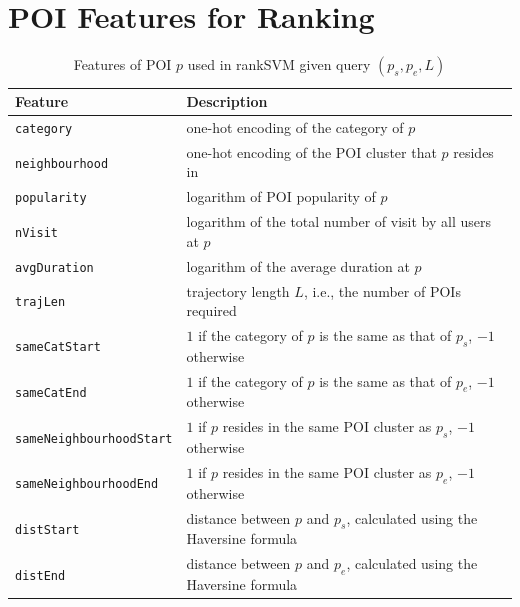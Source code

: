 

\onecolumn

\appendix



\section{POI Features for Ranking}

\begin{table}[ht]
\caption{Features of POI $p$ used in rankSVM given query $(p_s, p_e, L)$}
\label{tab:featurerank}
\centering
\setlength{\tabcolsep}{10pt} %
\begin{tabular}{l|l} \hline
\textbf{Feature}  & \textbf{Description} \\ \hline
\texttt{category}               & one-hot encoding of the category of $p$ \\
\texttt{neighbourhood}          & one-hot encoding of the POI cluster that $p$ resides in \\
\texttt{popularity}             & logarithm of POI popularity of $p$ \\
\texttt{nVisit}                 & logarithm of the total number of visit by all users at $p$ \\
\texttt{avgDuration}            & logarithm of the average duration at $p$ \\ \hline
\texttt{trajLen}                & trajectory length $L$, i.e., the number of POIs required \\
\texttt{sameCatStart}           & $1$ if the category of $p$ is the same as that of $p_s$, $-1$ otherwise \\
\texttt{sameCatEnd}             & $1$ if the category of $p$ is the same as that of $p_e$, $-1$ otherwise \\
\texttt{sameNeighbourhoodStart} & $1$ if $p$ resides in the same POI cluster as $p_s$, $-1$ otherwise \\
\texttt{sameNeighbourhoodEnd}   & $1$ if $p$ resides in the same POI cluster as $p_e$, $-1$ otherwise \\
\texttt{distStart}              & distance between $p$ and $p_s$, calculated using the Haversine formula \\
\texttt{distEnd}                & distance between $p$ and $p_e$, calculated using the Haversine formula \\

\end{tabular}
\end{table}
